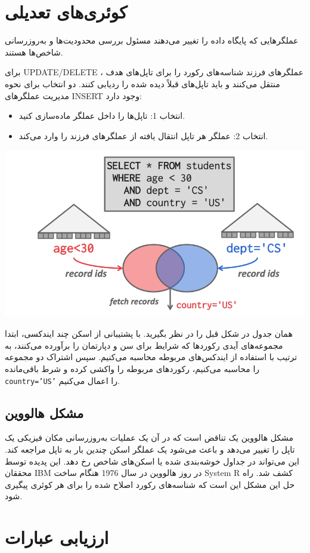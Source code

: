 \section{کوئری‌های تعدیلی}
عملگرهایی که پایگاه داده را تغییر می‌دهند مسئول بررسی محدودیت‌ها و به‌روزرسانی شاخص‌ها هستند. 

برای UPDATE/DELETE ، عملگرهای فرزند شناسه‌های رکورد را برای تاپل‌های هدف منتقل می‌کنند و باید تاپل‌های قبلاً دیده شده را ردیابی کنند. دو انتخاب برای نحوه مدیریت عملگرهای INSERT وجود دارد:
\begin{itemize}
	\item انتخاب 1: تاپل‌ها را داخل عملگر ماده‌سازی کنید.
	\item انتخاب 2: عملگر هر تاپل انتقال یافته از عملگرهای فرزند را وارد می‌کند.
\end{itemize}


\qquad\qquad\qquad	\includegraphics[width=0.7\linewidth]{screenshot006}

همان جدول در شکل قبل را در نظر بگیرید. با پشتیبانی از اسکن چند ایندکسی، ابتدا مجموعه‌های آیدی رکوردها که شرایط برای سن و دپارتمان را برآورده می‌کنند، به ترتیب با استفاده از ایندکس‌های مربوطه محاسبه می‌کنیم. سپس اشتراک دو مجموعه را محاسبه می‌کنیم، رکوردهای مربوطه را واکشی کرده و شرط باقی‌مانده \texttt{country='US'} را اعمال می‌کنیم.



\subsection{مشکل هالووین}
مشکل هالووین یک تناقض است که در آن یک عملیات به‌روزرسانی مکان فیزیکی یک تاپل را تغییر می‌دهد و باعث می‌شود یک عملگر اسکن چندین بار به تاپل مراجعه کند. این می‌تواند در جداول خوشه‌بندی شده یا اسکن‌های شاخص رخ دهد. این پدیده توسط محققان IBM در روز هالووین در سال 1976 هنگام ساخت System R کشف شد. راه حل این مشکل این است که شناسه‌های رکورد اصلاح شده را برای هر کوئری پیگیری شود.

\pagebreak

\section{ارزیابی عبارات}

